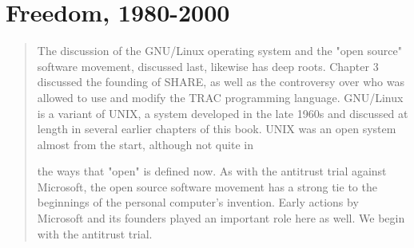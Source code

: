 \chapter{Freedom, 1980-2000}
\begin{quotation}
The discussion of the GNU/Linux operating system and the "open source" software 
movement, discussed last, likewise has deep roots. Chapter 3 discussed the 
founding of SHARE, as well as the controversy over who was allowed to use and 
modify the TRAC programming language. GNU/Linux is a variant of UNIX, a system 
developed in the late 1960s and discussed at length in several earlier chapters 
of this book. UNIX was an open system almost from the start, although not quite 
in

the ways that "open" is defined now. As with the antitrust trial against 
Microsoft, the open source software movement has a strong tie to the beginnings 
of the personal computer's invention. Early actions by Microsoft and its 
founders played an important role here as well. We begin with the antitrust 
trial.
\cite{history_of_modern_computing_2003_ceruzzi}
\end{quotation}
